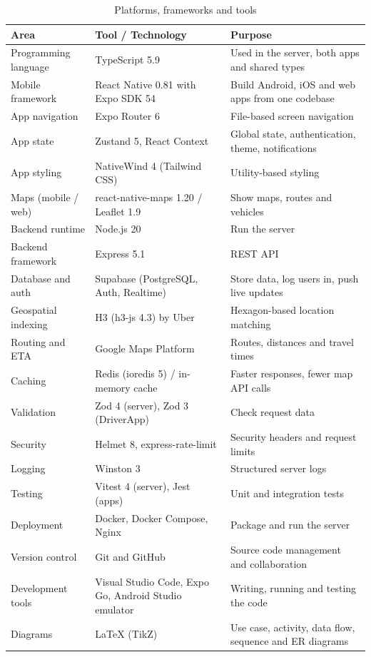 \begin{table}[H]
  \centering
  \small
  \caption{Platforms, frameworks and tools}
  \label{tab:tools}
  \begin{tabularx}{\textwidth}{@{}p{3.2cm}LL@{}}
    \toprule
    \textbf{Area} & \textbf{Tool / Technology} & \textbf{Purpose} \\
    \midrule
    Programming language & TypeScript 5.9 & Used in the server, both apps and shared types \\
    Mobile framework     & React Native 0.81 with Expo SDK 54 & Build Android, iOS and web apps from one codebase \\
    App navigation       & Expo Router 6 & File-based screen navigation \\
    App state            & Zustand 5, React Context & Global state, authentication, theme, notifications \\
    App styling          & NativeWind 4 (Tailwind CSS) & Utility-based styling \\
    Maps (mobile / web)  & react-native-maps 1.20 / Leaflet 1.9 & Show maps, routes and vehicles \\
    Backend runtime      & Node.js 20 & Run the server \\
    Backend framework    & Express 5.1 & REST API \\
    Database and auth    & Supabase (PostgreSQL, Auth, Realtime) & Store data, log users in, push live updates \\
    Geospatial indexing  & H3 (h3-js 4.3) by Uber & Hexagon-based location matching \\
    Routing and ETA      & Google Maps Platform & Routes, distances and travel times \\
    Caching              & Redis (ioredis 5) / in-memory cache & Faster responses, fewer map API calls \\
    Validation           & Zod 4 (server), Zod 3 (DriverApp) & Check request data \\
    Security             & Helmet 8, express-rate-limit & Security headers and request limits \\
    Logging              & Winston 3 & Structured server logs \\
    Testing              & Vitest 4 (server), Jest (apps) & Unit and integration tests \\
    Deployment           & Docker, Docker Compose, Nginx & Package and run the server \\
    Version control      & Git and GitHub & Source code management and collaboration \\
    Development tools    & Visual Studio Code, Expo Go, Android Studio emulator & Writing, running and testing the code \\
    Diagrams             & \LaTeX{} (TikZ) & Use case, activity, data flow, sequence and ER diagrams \\
    \bottomrule
  \end{tabularx}
\end{table}

